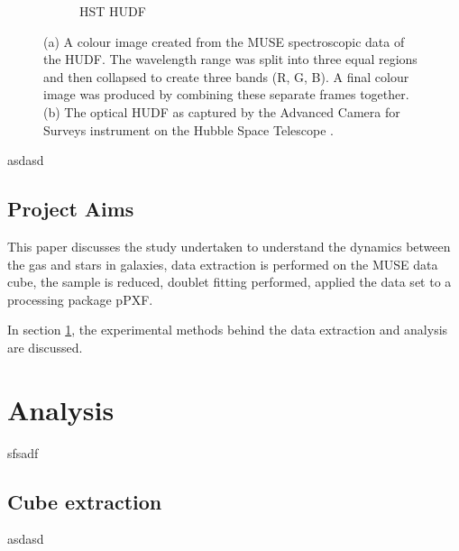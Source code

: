 \documentclass[12pt, twocolumn]{revtex4}    %
\begin{document}
\begin{figure}
\begin{subfigure}[b]{0.4\textwidth}
    \captionsetup{justification=justified}    
    \caption{HST HUDF}
    \label{fig:hubble_ultra_deep_field}
  \end{subfigure}
  \captionsetup{justification=justified}
  \caption[Hubble Ultra Deep Field]{(a) A colour image created from the MUSE spectroscopic data of the HUDF. The wavelength range was split into three equal regions and then collapsed to create three bands (R, G, B). A final colour image was produced by combining these separate frames together. (b) The optical HUDF as captured by the Advanced Camera for Surveys instrument on the Hubble Space Telescope \cite{hudf_image}. }
\end{figure}

\twocolumngrid

asdasd

\subsection{Project Aims}
This paper discusses the study undertaken to understand the dynamics between the gas and stars in galaxies, data extraction is performed on the MUSE data cube, the sample is reduced, doublet fitting performed, applied the data set to a processing package pPXF. 

In section \ref{analysis}, the experimental methods behind the data extraction and analysis are discussed. 

\section{Analysis} 
\label{analysis}

sfsadf

\subsection{Cube extraction}

asdasd

\onecolumngrid
\end{document}
